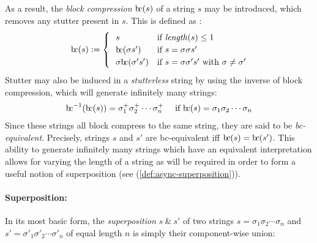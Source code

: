 \documentclass[a4paper,12pt,leqno]{article}
\newcommand{\bc}{{\rm b\!c}}
\renewcommand{\sp}{~\&~}
\begin{document}
As a result, the \textit{block compression} $\bc(s)$ of a string $s$ may be introduced, which removes any stutter present in $s$. This is defined as \citep{fernando2015semantics, woods2017towards}:
\begin{align}\label{def:bc}
\bc(s) := 
\begin{cases}
	~~s & \text{if \textit{length}}(s) \leq 1\\
	~~\bc(\sigma s') & \text{if } s = \sigma \sigma s'\\
	~~\sigma \bc(\sigma' s') & \text{if } s = \sigma \sigma' s' \text{ with } \sigma \neq \sigma'
\end{cases}
\end{align}
Stutter may also be induced in a \textit{stutterless} string by using the inverse of block compression, which will generate infinitely many strings:
\begin{align}
\bc^{-1}(\bc(s)) = \sigma_1^+ \sigma_2^+ \cdots \sigma_n^+ ~~~ \mbox{ if } \bc(s) = \sigma_1 \sigma_2 \cdots \sigma_n
\end{align}
Since these strings all block compress to the same string, they are said to be \textit{\bc -equivalent}. Precisely, strings $s$ and $s'$ are \bc -equivalent iff $\bc(s) = \bc(s')$. This ability to generate infinitely many strings which have an equivalent interpretation allows for varying the length of a string as will be required in order to form a useful notion of superposition (see (\ref{def:async-superposition})).

\paragraph{Superposition:}
In its most basic form, the \textit{superposition} $s \sp s'$ of two strings $s = \sigma_1\sigma_2\cdots\sigma_n$ and $s' = \sigma'_1\sigma'_2\cdots\sigma'_n$ of equal length $n$ is simply their component-wise union:
\end{document}
